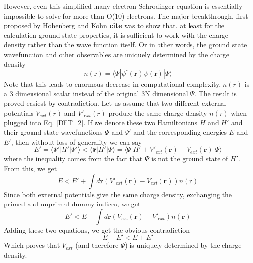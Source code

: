 \documentclass[12pt,a4paper]{article}
\newcommand{\Ps}{\Psi}
\newcommand{\ps}{\psi}
\newcommand{\da}{\dagger}
\newcommand{\la}{\langle}
\newcommand{\ra}{\rangle}
\newcommand{\rmb}{\mathbf{r}}
\begin{document}
However, even this simplified many-electron Schrodinger equation is essentially impossible to solve for more than O(10) electrons. The major breakthrough, first proposed by Hohenberg and Kohn \textbf{cite} was to show that, at least for the calculation ground state properties, it is sufficient to work with the charge density rather than the wave function itself. Or in other words, the ground state wavefunction and other observables are uniquely determined  by the charge density-
\begin{equation}
n(\rmb)= \la \Ps|\ps^\da (\rmb) \ps(\rmb) | \Ps\ra 
\end{equation}
Note that this leads to enormous decrease in computational complexity, $n(r)$ is a 3 dimensional scalar instead of the original 3N dimensional $\Ps$.  The result is proved easiest by contradiction. Let us assume that two different external potentials $V_{ext} (r)$ and $V'_{ext} (r)$ produce the same charge density $n(r)$
when plugged into Eq. \ref{DFT_2}. If we denote these two Hamiltonians $H$ and $H'$ and their ground state wavefunctions $\Ps$ and $\Ps'$ and the corresponding energies $E$ and $E'$, then without loss of generality we can say
\begin{equation}
E'=\la \Ps' | H' |\Ps' \ra < \la \Ps | H' |\Ps \ra = \la \Ps | H' + V'_{ext} (\rmb) -V_{ext} (\rmb)   |\Ps \ra
\end{equation}
where the inequality comes from the fact that $\Ps$ is not the ground state of $H'$. From this, we get
\begin{equation}
E < E' + \int d\rmb \left( V'_{ext} (\rmb) -V_{ext}(\rmb) \right) n(\rmb)
\end{equation}
Since both external potentials give the same charge density, exchanging the primed and unprimed dummy indices, we get
\begin{equation}
E' < E + \int d\rmb \left( V_{ext} (\rmb) -V'_{ext} \right) n(\rmb)
\end{equation}
Adding these two equations, we get the obvious contradiction
\begin{equation}
E+E' < E+E'
\end{equation}
 Which proves that $V_{ext}$ (and therefore $\Ps$) is uniquely determined by the charge density.
\end{document}
